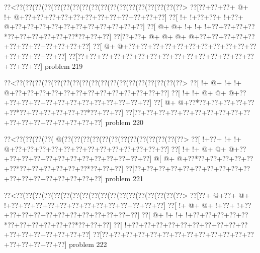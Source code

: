 \vbox{\vbox{\goo
\0??<\0??(\0??(\0??(\0??(\0??(\0??(\0??(\0??(\0??(\0??(\0??(\0??(\0??(\0??(\0??(\0??(\0??(\0??>
\0??[\0??+\0??+\0??+\- @+\- !+\- @+\0??+\0??+\0??+\0??+\0??+\0??+\0??+\0??+\0??+\0??+\0??+\0??]
\0??[\- !+\- !+\0??+\0??+\- !+\0??+\- @+\0??+\0??+\0??+\0??+\0??+\0??+\0??+\0??+\0??+\0??+\0??]
\0??[\- @+\- @+\- !+\- !+\- !+\0??+\0??+\0??+\0??*\0??+\0??+\0??+\0??+\0??+\0??*\0??+\0??+\0??]
\0??[\0??+\0??+\- @+\- @+\- @+\- @+\0??+\0??+\0??+\0??+\0??+\0??+\0??+\0??+\0??+\0??+\0??+\0??]
\0??[\- @+\- @+\0??+\0??+\0??+\0??+\0??+\0??+\0??+\0??+\0??+\0??+\0??+\0??+\0??+\0??+\0??+\0??]
\0??[\0??+\0??+\0??+\0??+\0??+\0??+\0??+\0??+\0??+\0??+\0??+\0??+\0??+\0??+\0??+\0??+\0??+\0??]
}
\hfil problem 219\hfil\break
}



\vbox{\vbox{\goo
\0??<\0??(\0??(\0??(\0??(\0??(\0??(\0??(\0??(\0??(\0??(\0??(\0??(\0??(\0??(\0??(\0??(\0??(\0??>
\0??[\- !+\- @+\- !+\- !+\- @+\0??+\0??+\0??+\0??+\0??+\0??+\0??+\0??+\0??+\0??+\0??+\0??+\0??]
\0??[\- !+\- !+\- @+\- @+\- @+\0??+\0??+\0??+\0??+\0??+\0??+\0??+\0??+\0??+\0??+\0??+\0??+\0??]
\0??[\- @+\- @+\0??*\0??+\0??+\0??+\0??+\0??+\0??*\0??+\0??+\0??+\0??+\0??+\0??*\0??+\0??+\0??]
\0??[\0??+\0??+\0??+\0??+\0??+\0??+\0??+\0??+\0??+\0??+\0??+\0??+\0??+\0??+\0??+\0??+\0??+\0??]
}
\hfil problem 220\hfil\break
}



\vbox{\vbox{\goo
\0??<\0??(\0??(\0??(\0??(\- @(\0??(\0??(\0??(\0??(\0??(\0??(\0??(\0??(\0??(\0??(\0??(\0??(\0??>
\0??[\- !+\0??+\- !+\- !+\- @+\0??+\0??+\0??+\0??+\0??+\0??+\0??+\0??+\0??+\0??+\0??+\0??+\0??]
\0??[\- !+\- !+\- @+\- @+\- @+\0??+\0??+\0??+\0??+\0??+\0??+\0??+\0??+\0??+\0??+\0??+\0??+\0??]
\- @[\- @+\- @+\0??*\0??+\0??+\0??+\0??+\0??+\0??*\0??+\0??+\0??+\0??+\0??+\0??*\0??+\0??+\0??]
\0??[\0??+\0??+\0??+\0??+\0??+\0??+\0??+\0??+\0??+\0??+\0??+\0??+\0??+\0??+\0??+\0??+\0??+\0??]
}
\hfil problem 221\hfil\break
}



\vbox{\vbox{\goo
\0??<\0??(\0??(\0??(\0??(\0??(\0??(\0??(\0??(\0??(\0??(\0??(\0??(\0??(\0??(\0??(\0??(\0??(\0??>
\0??[\0??+\- @+\0??+\- @+\- !+\0??+\0??+\0??+\0??+\0??+\0??+\0??+\0??+\0??+\0??+\0??+\0??+\0??]
\0??[\- !+\- @+\- @+\- !+\0??+\- !+\0??+\0??+\0??+\0??+\0??+\0??+\0??+\0??+\0??+\0??+\0??+\0??]
\0??[\- @+\- !+\- !+\- !+\0??+\0??+\0??+\0??+\0??*\0??+\0??+\0??+\0??+\0??+\0??*\0??+\0??+\0??]
\0??[\- !+\0??+\0??+\0??+\0??+\0??+\0??+\0??+\0??+\0??+\0??+\0??+\0??+\0??+\0??+\0??+\0??+\0??]
\0??[\0??+\0??+\0??+\0??+\0??+\0??+\0??+\0??+\0??+\0??+\0??+\0??+\0??+\0??+\0??+\0??+\0??+\0??]
}
\hfil problem 222\hfil\break
}



